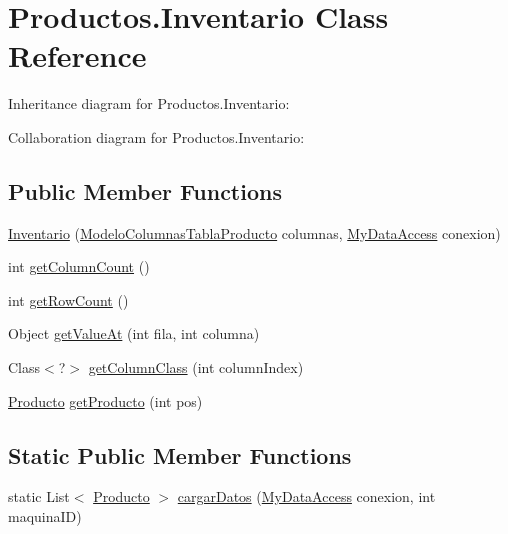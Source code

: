 \hypertarget{class_productos_1_1_inventario}{}\section{Productos.\+Inventario Class Reference}
\label{class_productos_1_1_inventario}


Inheritance diagram for Productos.\+Inventario\+:


Collaboration diagram for Productos.\+Inventario\+:
\subsection*{Public Member Functions}
\begin{DoxyCompactItemize}
\item 
\mbox{\hyperlink{class_productos_1_1_inventario_a679f0131ec8bfb9a78d5071ee72f6811}{Inventario}} (\mbox{\hyperlink{class_productos_1_1_modelo_columnas_tabla_producto}{Modelo\+Columnas\+Tabla\+Producto}} columnas, \mbox{\hyperlink{classconexion_s_q_l_1_1_my_data_access}{My\+Data\+Access}} conexion)
\item 
int \mbox{\hyperlink{class_productos_1_1_inventario_a0e88d355b4149cf548ae1cf27e5c342c}{get\+Column\+Count}} ()
\item 
int \mbox{\hyperlink{class_productos_1_1_inventario_ae299062aacb44852791e08833810e8bf}{get\+Row\+Count}} ()
\item 
Object \mbox{\hyperlink{class_productos_1_1_inventario_a79bccc9036dee4d92518ea4b21b3de3d}{get\+Value\+At}} (int fila, int columna)
\item 
Class$<$?$>$ \mbox{\hyperlink{class_productos_1_1_inventario_a7292cea9b1726ac1635a202f3528886e}{get\+Column\+Class}} (int column\+Index)
\item 
\mbox{\hyperlink{class_productos_1_1_producto}{Producto}} \mbox{\hyperlink{class_productos_1_1_inventario_adedc7e3eac62bbbc20bff33ffa9503f0}{get\+Producto}} (int pos)
\end{DoxyCompactItemize}
\subsection*{Static Public Member Functions}
\begin{DoxyCompactItemize}
\item 
static List$<$ \mbox{\hyperlink{class_productos_1_1_producto}{Producto}} $>$ \mbox{\hyperlink{class_productos_1_1_inventario_a89ddb54b03480d0e837f56be549b755c}{cargar\+Datos}} (\mbox{\hyperlink{classconexion_s_q_l_1_1_my_data_access}{My\+Data\+Access}} conexion, int maquina\+ID)
\end{DoxyCompactItemize}


